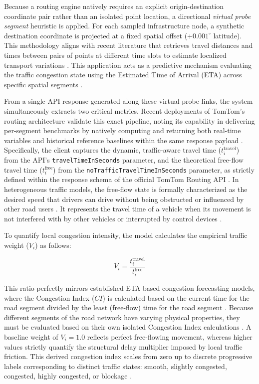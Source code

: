 {Because a routing engine natively requires an explicit origin-destination coordinate pair rather than an isolated point location, a directional \textit{virtual probe segment} heuristic is applied. For each sampled infrastructure node, a synthetic destination coordinate is projected at a fixed spatial offset ($+0.001^{\circ}$ latitude). This methodology aligns with recent literature that retrieves travel distances and times between pairs of points at different time slots to estimate localized transport variations \citep{munoz2021study}. This application acts as a predictive mechanism evaluating the traffic congestion state using the Estimated Time of Arrival (ETA) across specific spatial segments \citep{zafar2020traffic}.

From a single API response generated along these virtual probe links, the system simultaneously extracts two critical metrics. Recent deployments of TomTom's routing architecture validate this exact pipeline, noting its capability in delivering per-segment benchmarks by natively computing and returning both real-time variables and historical reference baselines within the same response payload \citep{vladut2025urbanscore}. Specifically, the client captures the dynamic, traffic-aware travel time ($t_i^{\text{travel}}$) from the API's \texttt{travelTimeInSeconds} parameter, and the theoretical free-flow travel time ($t_i^{\text{free}}$) from the \texttt{noTrafficTravelTimeInSeconds} parameter, as strictly defined within the response schema of the official TomTom Routing API \citep{tomtom2026routing}. In heterogeneous traffic models, the free-flow state is formally characterized as the desired speed that drivers can drive without being obstructed or influenced by other road users \citep{leong2020development}. It represents the travel time of a vehicle when its movement is not interfered with by other vehicles or interrupted by control devices \citep{leong2020development}. 

To quantify local congestion intensity, the model calculates the empirical traffic weight ($V_i$) as follows:

\[
V_i = \frac{t_i^{\text{travel}}}{t_i^{\text{free}}}
\]

This ratio perfectly mirrors established ETA-based congestion forecasting models, where the Congestion Index ($CI$) is calculated based on the current time for the road segment divided by the least (free-flow) time for the road segment \citep{zafar2020traffic}. Because different segments of the road network have varying physical properties, they must be evaluated based on their own isolated Congestion Index calculations \citep{zafar2020traffic}. A baseline weight of $V_i = 1.0$ reflects perfect free-flowing movement, whereas higher values strictly quantify the structural delay multiplier imposed by local traffic friction. This derived congestion index scales from zero up to discrete progressive labels corresponding to distinct traffic states: smooth, slightly congested, congested, highly congested, or blockage \citep{zafar2020traffic}. 

}
